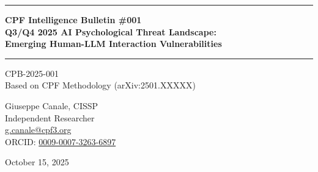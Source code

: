 \documentclass[11pt,a4paper]{article}
\begin{document}
\thispagestyle{empty}
\begin{center}
\vspace*{0.5cm}

\rule{\textwidth}{1.5pt}
\vspace{0.5cm}

{\LARGE \textbf{CPF Intelligence Bulletin \#001}}\\[0.3cm]
{\LARGE \textbf{Q3/Q4 2025 AI Psychological Threat Landscape:}}\\[0.3cm]
{\LARGE \textbf{Emerging Human-LLM Interaction Vulnerabilities}}

\vspace{0.5cm}
\rule{\textwidth}{1.5pt}
\vspace{0.3cm}

{\large \textsc{CPB-2025-001}}\\[0.2cm]
{\large Based on CPF Methodology (arXiv:2501.XXXXX)}

\vspace{0.5cm}

{\Large Giuseppe Canale, CISSP}\\[0.2cm]
Independent Researcher\\[0.1cm]
\href{mailto:g.canale@cpf3.org}{g.canale@cpf3.org}\\[0.1cm]
ORCID: \href{https://orcid.org/0009-0007-3263-6897}{0009-0007-3263-6897}

\vspace{0.8cm}
{\large October 15, 2025}
\vspace{1cm}
\end{center}

\begin{abstract}
\noindent
This intelligence bulletin presents the first systematic analysis of emerging psychological vulnerabilities in Large Language Model (LLM) deployments based on the Cybersecurity Psychology Framework (CPF). Between August and October 2025, four distinct threat patterns have been documented that exploit human-AI interaction dynamics: (1) Reasoning Theater Bias affecting advanced reasoning models (o1, DeepSeek-R1); (2) Differential automation bias creating uneven security team performance; (3) LLM-assisted social engineering documented in Microsoft Threat Intelligence reports; (4) Chain-of-thought exposure enabling advanced prompt injection attacks. Each pattern maps to existing CPF indicators, validating the framework's robustness while demonstrating its predictive capability for novel threats. All patterns are observable using CPF Field Kit methodologies and mathematical detection algorithms. This bulletin establishes the model for ongoing CPF threat intelligence dissemination.

\vspace{0.5em}
\noindent\textbf{Keywords:} LLM security, reasoning models, automation bias, social engineering, CPF, threat intelligence
\end{abstract}
\end{document}
